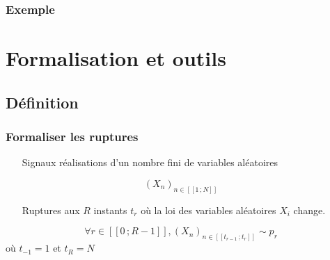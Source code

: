 \documentclass{beamer}
\begin{document}
\begin{frame}
	\frametitle{Exemple}
\end{frame}


		
		

\section{Formalisation et outils}

\subsection{Définition}

\begin{frame}

\frametitle{Formaliser les ruptures}

\begin{itemize}
	\item[Signaux] réalisations d'un nombre fini de variables aléatoires
\end{itemize}

\vspace{-.4cm}
\[ (X_n)_{n \in [\![ 1\,; N ]\!] } \]
\phantom{kcahkcah}
	
\begin{itemize}
	\item[Ruptures]aux $R$ instants $t_r$ où la loi des variables aléatoires $X_i$ change.
\end{itemize}

\vspace{-.4cm}
\[ \forall r \in [\![0\,;R-1]\!] , (X_n)_{n\in[\![t_{r-1}\,;t_r]\!]} \sim p_r\]
\hspace{.7cm}
où $t_{-1}=1$ et $t_R=N$


\end{frame}
\end{document}
